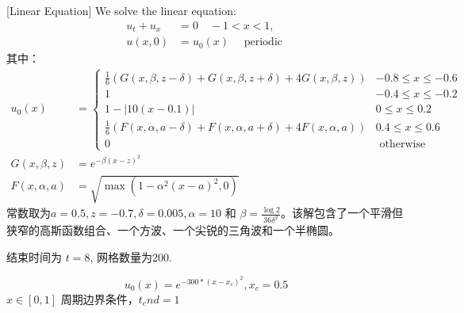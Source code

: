 \documentclass{book}
\begin{document}
\begin{example}{}{}
    [Linear Equation]
    We solve the linear equation\cite{RN56}:
    \begin{equation}
        \begin{aligned}
            u_{t}+u_{x} & =0 \quad-1<x<1,                    \\
            u(x, 0)     & =u_{0}(x) \quad \text { periodic }
        \end{aligned}
    \end{equation}
    其中：
    \begin{equation}
        \begin{aligned}
            u_{0}(x)        & =\begin{cases}
                                   \frac{1}{6}(G(x, \beta, z-\delta)+G(x, \beta, z+\delta)+4 G(x, \beta, z))    & -0.8 \leq x \leq-0.6 \\
                                   1                                                                            & -0.4 \leq x \leq-0.2 \\
                                   1-|10(x-0.1)|                                                                & 0 \leq x \leq 0.2    \\
                                   \frac{1}{6}(F(x, \alpha, a-\delta)+F(x, \alpha, a+\delta)+4 F(x, \alpha, a)) & 0.4 \leq x \leq 0.6  \\
                                   0                                                                            & \text { otherwise }
                               \end{cases} \\
            G(x, \beta, z)  & =e^{-\beta(x-z)^{2}}                                                                                 \\
            F(x, \alpha, a) & =\sqrt{\max \left(1-\alpha^{2}(x-a)^{2}, 0\right)}
        \end{aligned}
    \end{equation}
    常数取为$a=0.5, z=-0.7, \delta=0.005, \alpha=10$ 和 $\beta=\frac{\log 2}{36 \delta^{2}}$。该解包含了一个平滑但狭窄的高斯函数组合、一个方波、一个尖锐的三角波和一个半椭圆。

    结束时间为 $t=8$, 网格数量为200.
\end{example}
\begin{example}{}{}
    \cite{RN204}
    \begin{equation}
        u_0(x) = e^{-300*(x-x_c)^2},x_c=0.5
    \end{equation}
    $x\in[0,1]$ 周期边界条件，$t_end=1$
\end{example}
\end{document}
